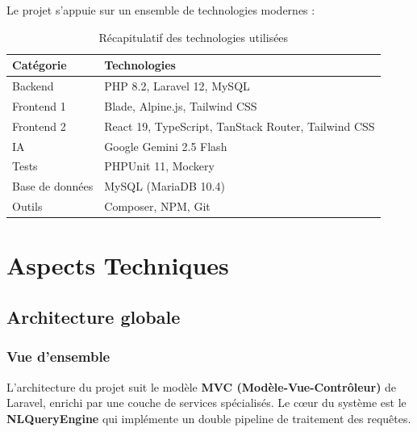 \documentclass[12pt,a4paper]{report}
\begin{document}
Le projet s'appuie sur un ensemble de technologies modernes :

\begin{table}[h]
\centering
\begin{tabularx}{\textwidth}{lX}
\toprule
\textbf{Catégorie} & \textbf{Technologies} \\
\midrule
Backend & PHP 8.2, Laravel 12, MySQL \\
Frontend 1 & Blade, Alpine.js, Tailwind CSS \\
Frontend 2 & React 19, TypeScript, TanStack Router, Tailwind CSS \\
IA & Google Gemini 2.5 Flash \\
Tests & PHPUnit 11, Mockery \\
Base de données & MySQL (MariaDB 10.4) \\
Outils & Composer, NPM, Git \\
\bottomrule
\end{tabularx}
\caption{Récapitulatif des technologies utilisées}
\end{table}

\newpage

\chapter{Aspects Techniques}

\section{Architecture globale}

\subsection{Vue d'ensemble}

L'architecture du projet suit le modèle \textbf{MVC (Modèle-Vue-Contrôleur)} de Laravel, enrichi par une couche de services spécialisés. Le cœur du système est le \textbf{NLQueryEngine} qui implémente un double pipeline de traitement des requêtes.
\end{document}
